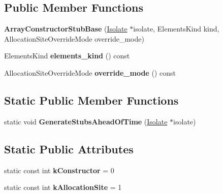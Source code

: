 \subsection*{Public Member Functions}
\begin{DoxyCompactItemize}
\item 
{\bfseries Array\+Constructor\+Stub\+Base} (\hyperlink{classv8_1_1internal_1_1_isolate}{Isolate} $\ast$isolate, Elements\+Kind kind, Allocation\+Site\+Override\+Mode override\+\_\+mode)\hypertarget{classv8_1_1internal_1_1_array_constructor_stub_base_a5f0e0ca83fe21bfce0f2504fd44cedc5}{}\label{classv8_1_1internal_1_1_array_constructor_stub_base_a5f0e0ca83fe21bfce0f2504fd44cedc5}

\item 
Elements\+Kind {\bfseries elements\+\_\+kind} () const \hypertarget{classv8_1_1internal_1_1_array_constructor_stub_base_ac736069b779982eb6c1e8c6049a419a4}{}\label{classv8_1_1internal_1_1_array_constructor_stub_base_ac736069b779982eb6c1e8c6049a419a4}

\item 
Allocation\+Site\+Override\+Mode {\bfseries override\+\_\+mode} () const \hypertarget{classv8_1_1internal_1_1_array_constructor_stub_base_a0d4e21d13752ba4a649c4b12c5beb8b3}{}\label{classv8_1_1internal_1_1_array_constructor_stub_base_a0d4e21d13752ba4a649c4b12c5beb8b3}

\end{DoxyCompactItemize}
\subsection*{Static Public Member Functions}
\begin{DoxyCompactItemize}
\item 
static void {\bfseries Generate\+Stubs\+Ahead\+Of\+Time} (\hyperlink{classv8_1_1internal_1_1_isolate}{Isolate} $\ast$isolate)\hypertarget{classv8_1_1internal_1_1_array_constructor_stub_base_a2a1630e7b51bd5b96b1b742cd57f0225}{}\label{classv8_1_1internal_1_1_array_constructor_stub_base_a2a1630e7b51bd5b96b1b742cd57f0225}

\end{DoxyCompactItemize}
\subsection*{Static Public Attributes}
\begin{DoxyCompactItemize}
\item 
static const int {\bfseries k\+Constructor} = 0\hypertarget{classv8_1_1internal_1_1_array_constructor_stub_base_a1f996ab3d2ddf2b485379945f126708d}{}\label{classv8_1_1internal_1_1_array_constructor_stub_base_a1f996ab3d2ddf2b485379945f126708d}

\item 
static const int {\bfseries k\+Allocation\+Site} = 1\hypertarget{classv8_1_1internal_1_1_array_constructor_stub_base_a95c8024ef3984c0a3862451761ea4226}{}\label{classv8_1_1internal_1_1_array_constructor_stub_base_a95c8024ef3984c0a3862451761ea4226}

\end{DoxyCompactItemize}
